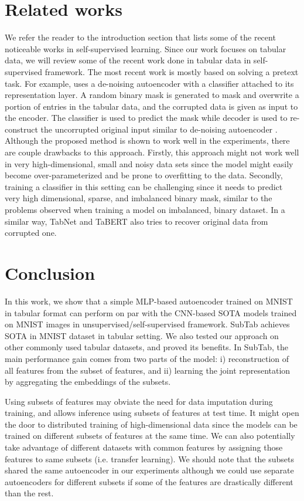 \section{Related works}

We refer the reader to the introduction section that lists some of the recent noticeable works in self-supervised learning. Since our work focuses on tabular data, we will review some of the recent work done in tabular data in self-supervised framework. The most recent work is mostly based on solving a pretext task. For example, \citet{yoon2020vime} uses a de-noising autoencoder with a classifier attached to its representation layer. A random binary mask is generated to mask and overwrite a portion of entries in the tabular data, and the corrupted data is given as input to the encoder. The classifier is used to predict the mask while decoder is used to re-construct the uncorrupted original input similar to de-noising autoencoder \citep{vincent2008extracting}. Although the proposed method is shown to work well in the experiments, there are couple drawbacks to this approach. Firstly, this approach might not work well in very high-dimensional, small and noisy data sets since the model might easily become over-parameterized and be prone to overfitting to the data. Secondly, training a classifier in this setting can be challenging since it needs to predict very high dimensional, sparse, and imbalanced binary mask, similar to the problems observed when training a model on imbalanced, binary dataset. In a similar way, TabNet \citep{arik2019tabnet} and TaBERT \citep{yin2020tabert} also tries to recover original data from corrupted one.

\section{Conclusion}\label{conclusion}
In this work, we show that a simple MLP-based autoencoder trained on MNIST in tabular format can perform on par with the CNN-based SOTA models trained on MNIST images in unsupervised/self-supervised framework. SubTab achieves SOTA in MNIST dataset in tabular setting. We also tested our approach on other commonly used tabular datasets, and proved its benefits. In SubTab, the main performance gain comes from two parts of the model: i) reconstruction of all features from the subset of features, and ii) learning the joint representation by aggregating the embeddings of the subsets.

Using subsets of features may obviate the need for data imputation during training, and allows inference using subsets of features at test time. It might open the door to distributed training of high-dimensional data since the models can be trained on different subsets of features at the same time. We can also potentially take advantage of different datasets with common features by assigning those features to same subsets (i.e. transfer learning). We should note that the subsets shared the same autoencoder in our experiments although we could use separate autoencoders for different subsets if some of the features are drastically different than the rest.

